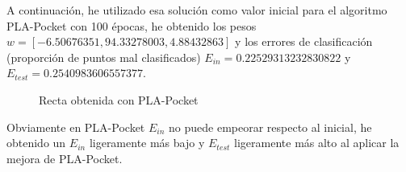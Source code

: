 \documentclass[a4]{article}
\begin{document}
A continuación, he utilizado esa solución como valor inicial para
el algoritmo PLA-Pocket con 100 épocas, he obtenido los pesos $w= [-6.50676351, 94.33278003, 4.88432863]$
y los errores de clasificación (proporción de puntos mal clasificados)
$E_{in} = 0.22529313232830822$ y $E_{test} = 0.2540983606557377$.

\begin{figure}[H]
    \centering
    \caption{Recta obtenida con PLA-Pocket}
    \label{fig:lin-regress}
\end{figure}
\vspace{-3mm}

Obviamente en PLA-Pocket $E_{in}$ no puede empeorar respecto al inicial,
he obtenido un $E_{in}$ ligeramente más bajo y $E_{test}$ ligeramente más alto 
al aplicar la mejora de PLA-Pocket.
\end{document}
